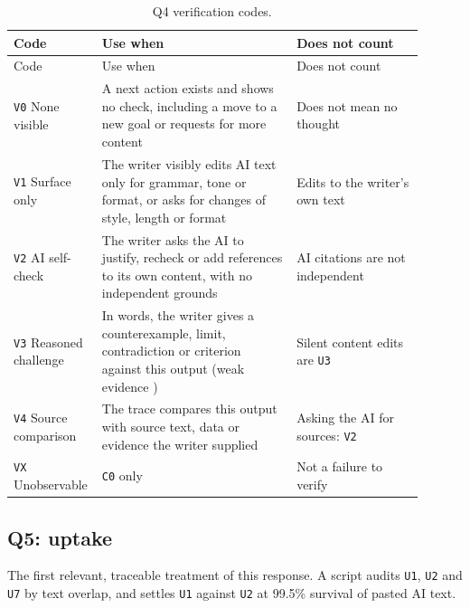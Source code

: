 \documentclass[manuscript,screen]{acmart}
\newcommand{\code}[1]{\texttt{#1}}
\begin{document}
\begin{longtable}{p{0.14\linewidth}p{0.46\linewidth}p{0.30\linewidth}}
\caption{Q4 verification codes.}\\
\toprule
Code & Use when & Does not count \\
\midrule
\endfirsthead
\toprule
Code & Use when & Does not count \\
\midrule
\endhead
\code{V0} None visible & A next action exists and shows no check, including a move to a new goal or requests for more content & Does not mean no thought \\
\code{V1} Surface only & The writer visibly edits AI text only for grammar, tone or format, or asks for changes of style, length or format & Edits to the writer's own text \\
\code{V2} AI self-check & The writer asks the AI to justify, recheck or add references to its own content, with no independent grounds & AI citations are not independent \\
\code{V3} Reasoned challenge & In words, the writer gives a counterexample, limit, contradiction or criterion against this output (weak evidence \cite{tao2026}) & Silent content edits are \code{U3} \\
\code{V4} Source comparison & The trace compares this output with source text, data or evidence the writer supplied & Asking the AI for sources: \code{V2} \\
\code{VX} Unobservable & \code{C0} only & Not a failure to verify \\
\bottomrule
\end{longtable}

\subsection{Q5: uptake}

The first relevant, traceable treatment of this response. A script audits \code{U1}, \code{U2} and \code{U7} by text overlap, and settles \code{U1} against \code{U2} at 99.5\% survival of pasted AI text.
\end{document}
